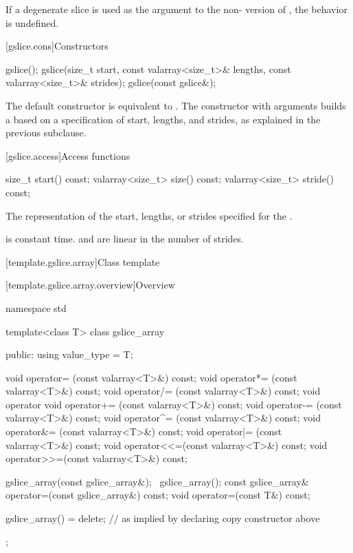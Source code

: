 \pnum
If a degenerate slice is used as the argument to the
non-
version of
,
the behavior is undefined.
%

[gslice.cons]{Constructors}

%
\begin{itemdecl}
gslice();
gslice(size_t start, const valarray<size_t>& lengths,
         const valarray<size_t>& strides);
gslice(const gslice&);
\end{itemdecl}

\begin{itemdescr}
\pnum
The default constructor is equivalent to
.
The constructor with arguments builds a
based on a specification of start, lengths, and strides, as explained
in the previous subclause.
\end{itemdescr}

[gslice.access]{Access functions}

%
%
%
\begin{itemdecl}
size_t           start()  const;
valarray<size_t> size() const;
valarray<size_t> stride() const;
\end{itemdecl}

\begin{itemdescr}
\pnum
\returns The representation of the
start, lengths, or strides specified for the .

\pnum
\complexity {} is constant time.  and 
are linear in the number of strides.
\end{itemdescr}

[template.gslice.array]{Class template }

[template.gslice.array.overview]{Overview}

%
%
\begin{codeblock}
namespace std {
  template<class T> class gslice_array {
  public:
    using value_type = T;

    void operator=  (const valarray<T>&) const;
    void operator*= (const valarray<T>&) const;
    void operator/= (const valarray<T>&) const;
    void operator%
    void operator+= (const valarray<T>&) const;
    void operator-= (const valarray<T>&) const;
    void operator^= (const valarray<T>&) const;
    void operator&= (const valarray<T>&) const;
    void operator|= (const valarray<T>&) const;
    void operator<<=(const valarray<T>&) const;
    void operator>>=(const valarray<T>&) const;

    gslice_array(const gslice_array&);
    ~gslice_array();
    const gslice_array& operator=(const gslice_array&) const;
    void operator=(const T&) const;

    gslice_array() = delete;      // as implied by declaring copy constructor above
  };
}
\end{codeblock}

